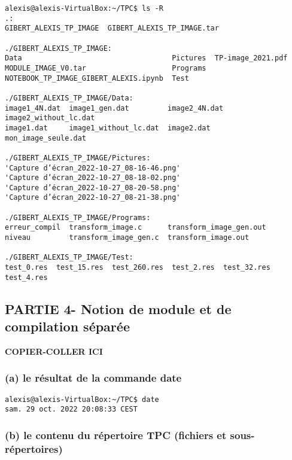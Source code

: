 \documentclass[11pt]{article}
\begin{document}
\begin{verbatim}
alexis@alexis-VirtualBox:~/TPC$ ls -R
.:
GIBERT_ALEXIS_TP_IMAGE  GIBERT_ALEXIS_TP_IMAGE.tar

./GIBERT_ALEXIS_TP_IMAGE:
Data                                   Pictures  TP-image_2021.pdf
MODULE_IMAGE_V0.tar                    Programs
NOTEBOOK_TP_IMAGE_GIBERT_ALEXIS.ipynb  Test

./GIBERT_ALEXIS_TP_IMAGE/Data:
image1_4N.dat  image1_gen.dat         image2_4N.dat  image2_without_lc.dat
image1.dat     image1_without_lc.dat  image2.dat     mon_image_seule.dat

./GIBERT_ALEXIS_TP_IMAGE/Pictures:
'Capture d’écran_2022-10-27_08-16-46.png'
'Capture d’écran_2022-10-27_08-18-02.png'
'Capture d’écran_2022-10-27_08-20-58.png'
'Capture d’écran_2022-10-27_08-21-38.png'

./GIBERT_ALEXIS_TP_IMAGE/Programs:
erreur_compil  transform_image.c      transform_image_gen.out
niveau         transform_image_gen.c  transform_image.out

./GIBERT_ALEXIS_TP_IMAGE/Test:
test_0.res  test_15.res  test_260.res  test_2.res  test_32.res  test_4.res
\end{verbatim}

    \subsection{PARTIE 4- Notion de module et de compilation
séparée}\label{partie-4--notion-de-module-et-de-compilation-suxe9paruxe9e}

\textbf{COPIER-COLLER ICI}

\subsubsection{(a) le résultat de la commande
date}\label{a-le-ruxe9sultat-de-la-commande-date}

\begin{verbatim}
alexis@alexis-VirtualBox:~/TPC$ date
sam. 29 oct. 2022 20:08:33 CEST
\end{verbatim}

\subsubsection{(b) le contenu du répertoire TPC (fichiers et
sous-répertoires)}\label{b-le-contenu-du-ruxe9pertoire-tpc-fichiers-et-sous-ruxe9pertoires}
\end{document}
